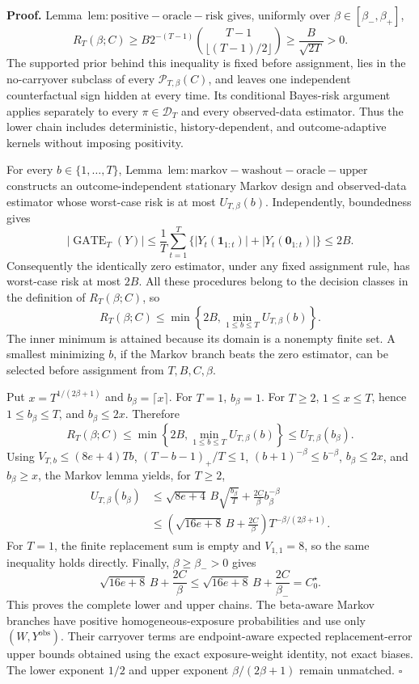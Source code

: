 \textbf{Proof.} Lemma~\(\mathrm{lem:positive-oracle-risk}\) gives, uniformly over \(\beta\in[\beta_-,\beta_+]\),
\[
R_T(\beta;C)
\ge B2^{-(T-1)}\binom{T-1}{\lfloor(T-1)/2\rfloor}
\ge\frac{B}{\sqrt{2T}}>0.
\]
The supported prior behind this inequality is fixed before assignment, lies in the no-carryover subclass of every \(\mathcal P_{T,\beta}(C)\), and leaves one independent counterfactual sign hidden at every time. Its conditional Bayes-risk argument applies separately to every \(\pi\in\mathcal D_T\) and every observed-data estimator. Thus the lower chain includes deterministic, history-dependent, and outcome-adaptive kernels without imposing positivity.

For every \(b\in\{1,\ldots,T\}\), Lemma~\(\mathrm{lem:markov-washout-oracle-upper}\) constructs an outcome-independent stationary Markov design and observed-data estimator whose worst-case risk is at most \(U_{T,\beta}(b)\). Independently, boundedness gives
\[
|\operatorname{GATE}_T(Y)|
\le\frac1T\sum_{t=1}^T\{|Y_t(\mathbf1_{1:t})|+|Y_t(\mathbf0_{1:t})|\}
\le2B.
\]
Consequently the identically zero estimator, under any fixed assignment rule, has worst-case risk at most \(2B\). All these procedures belong to the decision classes in the definition of \(R_T(\beta;C)\), so
\[
R_T(\beta;C)
\le\min\left\{2B,\min_{1\le b\le T}U_{T,\beta}(b)\right\}.
\]
The inner minimum is attained because its domain is a nonempty finite set. A smallest minimizing \(b\), if the Markov branch beats the zero estimator, can be selected before assignment from \(T,B,C,\beta\).

Put \(x=T^{1/(2\beta+1)}\) and \(b_\beta=\lceil x\rceil\). For \(T=1\), \(b_\beta=1\). For \(T\ge2\), \(1\le x\le T\), hence \(1\le b_\beta\le T\), and \(b_\beta\le2x\). Therefore
\[
R_T(\beta;C)
\le\min\left\{2B,\min_{1\le b\le T}U_{T,\beta}(b)\right\}
\le U_{T,\beta}(b_\beta).
\]
Using \(V_{T,b}\le(8e+4)Tb\), \((T-b-1)_+/T\le1\), \((b+1)^{-\beta}\le b^{-\beta}\), \(b_\beta\le2x\), and \(b_\beta\ge x\), the Markov lemma yields, for \(T\ge2\),
\[
\begin{aligned}
U_{T,\beta}(b_\beta)
&\le\sqrt{8e+4}\,B\sqrt{\frac{b_\beta}{T}}
+\frac{2C}{\beta}b_\beta^{-\beta}\\
&\le\left(\sqrt{16e+8}\,B+\frac{2C}{\beta}\right)
T^{-\beta/(2\beta+1)}.
\end{aligned}
\]
For \(T=1\), the finite replacement sum is empty and \(V_{1,1}=8\), so the same inequality holds directly. Finally, \(\beta\ge\beta_->0\) gives
\[
\sqrt{16e+8}\,B+\frac{2C}{\beta}
\le \sqrt{16e+8}\,B+\frac{2C}{\beta_-}=C_0^\star.
\]
This proves the complete lower and upper chains. The beta-aware Markov branches have positive homogeneous-exposure probabilities and use only \((W,Y^{\mathrm{obs}})\). Their carryover terms are endpoint-aware expected replacement-error upper bounds obtained using the exact exposure-weight identity, not exact biases. The lower exponent \(1/2\) and upper exponent \(\beta/(2\beta+1)\) remain unmatched. \(\square\)